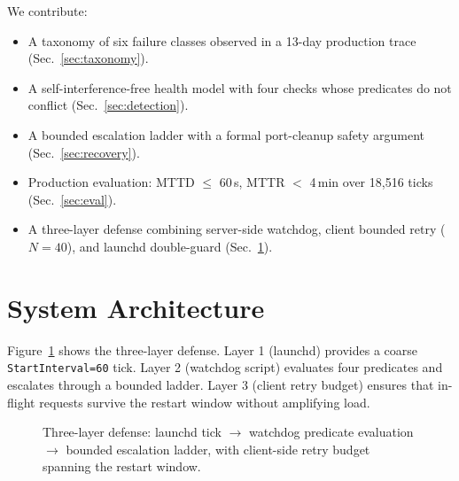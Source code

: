 \documentclass[10pt]{article}
\begin{document}
We contribute:
\begin{itemize}[nosep]
  \item A taxonomy of six failure classes observed in a 13-day production trace (Sec.~\ref{sec:taxonomy}).
  \item A self-interference-free health model with four checks whose predicates do not conflict (Sec.~\ref{sec:detection}).
  \item A bounded escalation ladder with a formal port-cleanup safety argument (Sec.~\ref{sec:recovery}).
  \item Production evaluation: MTTD $\le$ 60\,s, MTTR $<$ 4\,min over 18{,}516 ticks (Sec.~\ref{sec:eval}).
  \item A three-layer defense combining server-side watchdog, client bounded retry ($N{=}40$), and launchd double-guard (Sec.~\ref{sec:architecture}).
\end{itemize}

\section{System Architecture}\label{sec:architecture}

Figure~\ref{fig:arch} shows the three-layer defense. Layer 1 (launchd) provides a coarse \texttt{StartInterval=60} tick. Layer 2 (watchdog script) evaluates four predicates and escalates through a bounded ladder. Layer 3 (client retry budget) ensures that in-flight requests survive the restart window without amplifying load.

\begin{figure}[t]\centering
{}
\caption{Three-layer defense: launchd tick $\to$ watchdog predicate evaluation $\to$ bounded escalation ladder, with client-side retry budget spanning the restart window.}
\label{fig:arch}
\end{figure}
\end{document}
